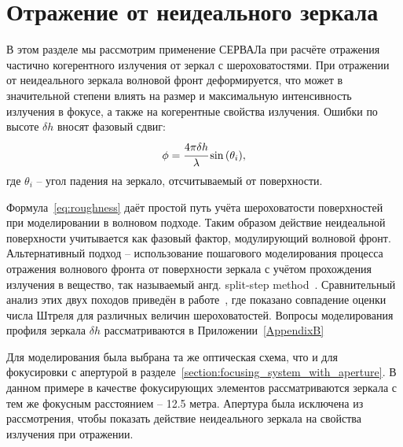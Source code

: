 \section{Отражение от неидеального зеркала}\label{section:roughness}
В этом разделе мы рассмотрим применение СЕРВАЛа при расчёте отражения частично когерентного излучения от зеркал с шероховатостями. При отражении от неидеального зеркала волновой фронт деформируется, что может в значительной степени влиять на размер и максимальную интенсивность излучения в фокусе, а также на когерентные свойства излучения. Ошибки по высоте $\delta h$ вносят фазовый сдвиг: 
\begin{align}
	\phi = \cfrac{4 \pi \delta h}{\lambda} \sin{(\theta_i)},
	\label{eq:roughness}
\end{align}
где $\theta_i$ -- угол падения на зеркало, отсчитываемый от поверхности. 

Формула~\ref{eq:roughness} даёт простой путь учёта шероховатости поверхностей при моделировании в волновом подходе. Таким образом действие неидеальной поверхности учитывается как фазовый фактор, модулирующий волновой фронт. Альтернативный подход -- использование пошагового моделирования процесса отражения волнового фронта от поверхности зеркала с учётом прохождения излучения в вещество, так называемый ангд. split-step method~\cite{serkez_design_2015}. Сравнительный анализ этих двух походов приведён в работе~\cite{serkez_design_2015}, где показано совпадение оценки числа Штреля для различных величин шероховатостей. Вопросы моделирования профиля зеркала $\delta h$ рассматриваются в Приложении~\ref{AppendixB}

Для моделирования была выбрана та же оптическая схема, что и для фокусировки с апертурой в разделе~\ref{section:focusing_system_with_aperture}. В данном примере в качестве фокусирующих элементов рассматриваются зеркала с тем же фокусным расстоянием -- 12.5 метра. Апертура была исключена из рассмотрения, чтобы показать действие неидеального зеркала на свойства излучения при отражении. 

